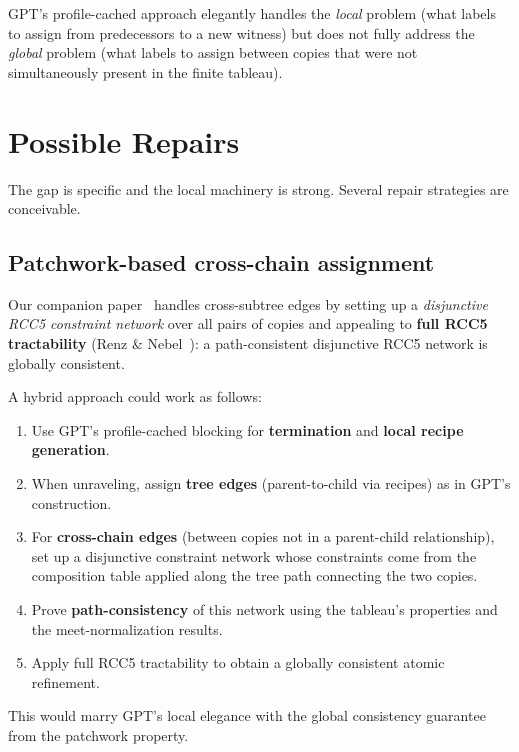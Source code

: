\documentclass[a4paper,11pt]{article}
\theoremstyle{definition}
\begin{document}
GPT's profile-cached approach elegantly handles the \emph{local}
problem (what labels to assign from predecessors to a new witness)
but does not fully address the \emph{global} problem (what labels to
assign between copies that were not simultaneously present in the
finite tableau).


\section{Possible Repairs}
\label{sec:repairs}

The gap is specific and the local machinery is strong.  Several
repair strategies are conceivable.

\subsection{Patchwork-based cross-chain assignment}
\label{sec:repair-patchwork}

Our companion paper~\cite{ExtensionGap} handles cross-subtree edges
by setting up a \emph{disjunctive RCC5 constraint network} over
all pairs of copies and appealing to \textbf{full RCC5 tractability}
(Renz \& Nebel~\cite{RenzNebel1999}): a path-consistent disjunctive
RCC5 network is globally consistent.

A hybrid approach could work as follows:
\begin{enumerate}[nosep]
\item Use GPT's profile-cached blocking for \textbf{termination} and
  \textbf{local recipe generation}.
\item When unraveling, assign \textbf{tree edges} (parent-to-child
  via recipes) as in GPT's construction.
\item For \textbf{cross-chain edges} (between copies not in a
  parent-child relationship), set up a disjunctive constraint network
  whose constraints come from the composition table applied along the
  tree path connecting the two copies.
\item Prove \textbf{path-consistency} of this network using the
  tableau's properties and the meet-normalization results.
\item Apply full RCC5 tractability to obtain a globally consistent
  atomic refinement.
\end{enumerate}

This would marry GPT's local elegance with the global consistency
guarantee from the patchwork property.
\end{document}
